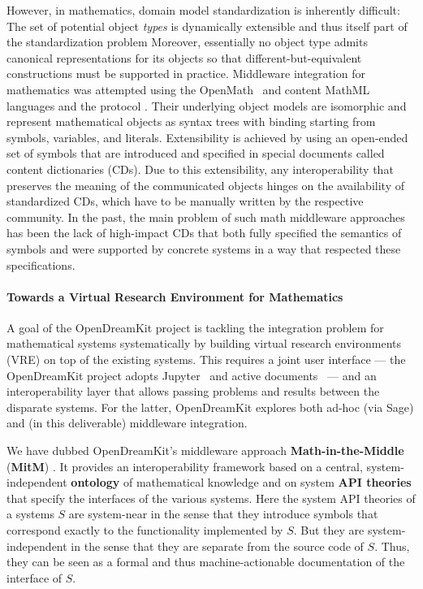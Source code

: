However, in mathematics, domain model standardization is inherently difficult:
The set of potential object \emph{types} is dynamically extensible and thus itself part of the standardization problem
Moreover, essentially no object type admits canonical representations for its objects so that different-but-equivalent constructions must be supported in practice.
Middleware integration for mathematics was attempted using the OpenMath~\cite{BusCapCar:2oms04} and content MathML~\cite{CarlisleEd:MathML3:base} languages and the \SCSCP protocol \cite{SCSCP-1.3}.
Their underlying object models are isomorphic and represent mathematical objects as syntax trees with binding starting from symbols, variables, and literals.
Extensibility is achieved by using an open-ended set of symbols that are introduced and specified in special documents called content dictionaries (CDs).
Due to this extensibility, any interoperability that preserves the meaning of the communicated objects hinges on the availability of standardized CDs, which have to be manually written by the respective community.
In the past, the main problem of such math middleware approaches has been the lack of high-impact CDs that both fully specified the semantics of symbols and were supported by concrete systems in a way that respected these specifications.

\paragraph{Towards a Virtual Research Environment for Mathematics}
A goal of the OpenDreamKit project is tackling the integration problem for mathematical systems systematically by building virtual research environments (VRE) on top of the existing systems.
This requires a joint user interface --- the OpenDreamKit project adopts Jupyter~\cite{jupyter-project:on} and active documents~\cite{KohDavGin:psewads11} --- and an interoperability layer that allows passing problems and results between the disparate systems.
For the latter, OpenDreamKit explores both ad-hoc (via Sage) and (in this deliverable) middleware integration.

We have dubbed OpenDreamKit's middleware approach \textbf{Math-in-the-Middle} (\textbf{MitM}) \cite{DehKohKon:iop16}.
It provides an interoperability framework based on a central, system-independent \textbf{ontology} of mathematical knowledge and on system \textbf{API theories} that specify the interfaces of the various systems.
Here the system API theories of a systems $S$ are system-near in the sense that they introduce symbols that correspond exactly to the functionality implemented by $S$.
But they are system-independent in the sense that they are separate from the source code of $S$.
Thus, they can be seen as a formal and thus machine-actionable documentation of the interface of $S$.


